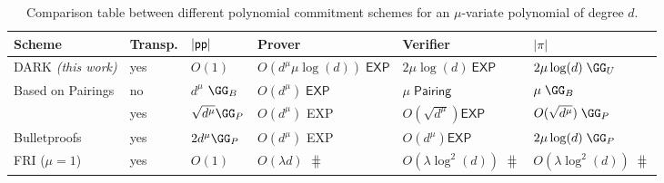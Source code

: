 \begin{table}[!htp]
\begin{small}
\begin{tabular}{l||l|l|l|l|l}
	Scheme & Transp. & $|\textsf{pp}|$  & Prover & Verifier & $|\pi|$ \\
	\hline
	\hline
    DARK  \textit{(this work)} & yes & $O(1)$ & $O( d^\mu \mu \log(d) )\; \textsf{EXP}$ & $2\mu \log(d)~\textsf{EXP}$ & $2 \mu \log(d) \; \GG_{U}$ \\
    Based on Pairings & no & $d^\mu$ $\GG_{B}$ & $O(d^\mu)\; \textsf{EXP}$  & $\mu\; \textsf{Pairing} $ & $\mu \; \GG_{B}$\\
    \cite[$\sqrt{\cdot}$]{EC:BCCGP16} & yes & $\sqrt{d^\mu}\GG_{P}$ & $O(d^\mu)$ \textsf{EXP} & $O(\sqrt{d^\mu})\textsf{EXP}$ &$O(\sqrt{d^\mu}) \; \GG_P$\\
       \textsf{Bulletproofs} & yes &$2 d^\mu\GG_{P}$& $O(d^\mu)$ \textsf{EXP}& $O(d^\mu)\textsf{EXP}$ &$2 \mu \log(d) \; \GG_P$\\
       FRI  ($\mu = 1$) & yes & $O(1)$ & $O(\lambda  d)$ $\hash$ & $O(\lambda \log^2(d))$ $\hash$ & $O(\lambda \log^2(d)) \; \hash$
\end{tabular}

\caption{Comparison table between different polynomial commitment schemes for an $\mu$-variate polynomial of degree $d$.}

\label{tab:polycommit}
\end{small}
\end{table}
